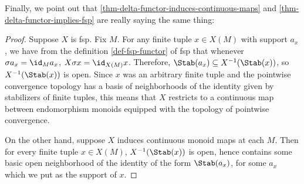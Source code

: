 Finally, we point out that \ref{thm-delta-functor-induces-continuous-maps} and \ref{thm-delta-functor-implies-fsp} are really saying the same thing:

\begin{proof}
  Suppose $X$ is fsp. Fix $M$. For any finite tuple $x \in X(M)$ with support $a_x$, we have from the definition \ref{def-fsp-functor} of fsp that whenever $\sigma a_x = \id_M a_x$, $X \sigma x = \id_{X(M)} x$. Therefore, $\Stab(a_x) \subseteq X^{-1}(\Stab(x))$, so $X^{-1}(\Stab(x))$ is open. Since $x$ was an arbitrary finite tuple and the pointwise convergence topology has a basis of neighborhoods of the identity given by stabilizers of finite tuples, this means that $X$ restricts to a continuous map between endomorphism monoids equipped with the topology of pointwise convergence.

  On the other hand, suppose $X$ induces continuous monoid maps at each $M$. Then for every finite tuple $x \in X(M)$, $X^{-1}(\Stab(x))$ is open, hence contains some basic open neighborhood of the identity of the form $\Stab(a_x)$, for some $a_x$ which we put as the support of $x$.
  \end{proof}




